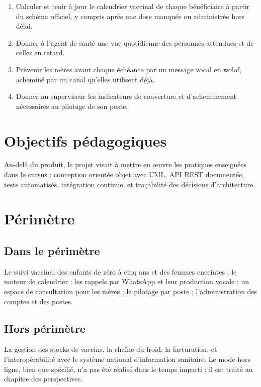 \documentclass[11pt,a4paper]{report}
\begin{document}
\begin{enumerate}[label=\textbf{OS-\arabic*.}, leftmargin=1.5cm]
  \item Calculer et tenir à jour le calendrier vaccinal de chaque
  bénéficiaire à partir du schéma officiel, y compris après une dose
  manquée ou administrée hors délai.
  \item Donner à l'agent de santé une vue quotidienne des personnes
  attendues et de celles en retard.
  \item Prévenir les mères avant chaque échéance par un message vocal en
  wolof, acheminé par un canal qu'elles utilisent déjà.
  \item Donner au superviseur les indicateurs de couverture et
  d'acheminement nécessaires au pilotage de son poste.
\end{enumerate}

\section{Objectifs pédagogiques}

Au-delà du produit, le projet visait à mettre en œuvre les pratiques
enseignées dans le cursus : conception orientée objet avec UML, API REST
documentée, tests automatisés, intégration continue, et traçabilité des
décisions d'architecture.

\section{Périmètre}

\subsection*{Dans le périmètre}

Le suivi vaccinal des enfants de zéro à cinq ans et des femmes enceintes ;
le moteur de calendrier ; les rappels par WhatsApp et leur production
vocale ; un espace de consultation pour les mères ; le pilotage par poste ;
l'administration des comptes et des postes.

\subsection*{Hors périmètre}

La gestion des stocks de vaccins, la chaîne du froid, la facturation, et
l'interopérabilité avec le système national d'information sanitaire. Le mode
hors ligne, bien que spécifié, n'a pas été réalisé dans le temps imparti ; il
est traité au chapitre des perspectives.
\end{document}
